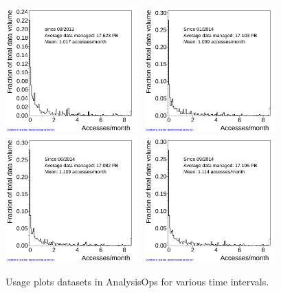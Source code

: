 \begin{figure}[h!]
  \centering
  \includegraphics[width=0.45\textwidth]{plots/analysisOps_usage.png}~ 
  \includegraphics[width=0.45\textwidth]{plots/DatasetSummary01-2014_nSitesAverage.png}\\
  \includegraphics[width=0.45\textwidth]{plots/DatasetSummary06-2014_nSitesAverage.png}~
  \includegraphics[width=0.45\textwidth]{plots/DatasetSummary09-2014_nSitesAverage.png}
  \caption{Usage plots datasets in AnalysisOps for various time intervals.}
  \label{fig:usage}
\end{figure}

